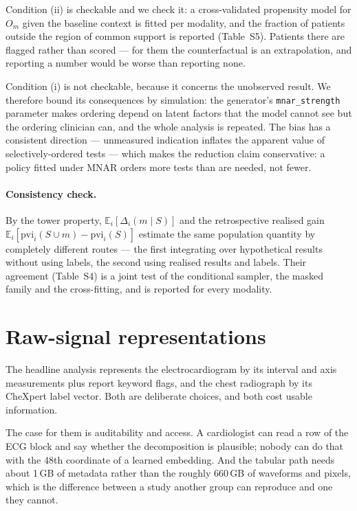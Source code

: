 \documentclass[11pt]{article}
\theoremstyle{definition}
\theoremstyle{remark}
\newcommand{\pvi}{\mathrm{pvi}}
\newcommand{\E}{\mathbb{E}}
\begin{document}
Condition (ii) is checkable and we check it: a cross-validated propensity model
for $O_m$ given the baseline context is fitted per modality, and the fraction of
patients outside the region of common support is reported (Table~S5). Patients
there are flagged rather than scored --- for them the counterfactual is an
extrapolation, and reporting a number would be worse than reporting none.

Condition (i) is not checkable, because it concerns the unobserved result. We
therefore bound its consequences by simulation: the generator's
\texttt{mnar\_strength} parameter makes ordering depend on latent factors that
the model cannot see but the ordering clinician can, and the whole analysis is
repeated. The bias has a consistent direction --- unmeasured indication inflates
the apparent value of selectively-ordered tests --- which makes the reduction
claim conservative: a policy fitted under MNAR orders more tests than are needed,
not fewer.

\paragraph{Consistency check.} By the tower property,
$\E_i[\Delta_i(m\mid S)]$ and the retrospective realised gain
$\E_i[\pvi_i(S\cup m)-\pvi_i(S)]$ estimate the same population quantity by
completely different routes --- the first integrating over hypothetical results
without using labels, the second using realised results and labels. Their
agreement (Table~S4) is a joint test of the conditional sampler, the masked
family and the cross-fitting, and is reported for every modality.


\section{Raw-signal representations}
\label{sec:s-raw}
\label{sec:raw}

The headline analysis represents the electrocardiogram by its interval and axis
measurements plus report keyword flags, and the chest radiograph by its CheXpert
label vector. Both are deliberate choices, and both cost usable information.

The case for them is auditability and access. A cardiologist can read a row of
the ECG block and say whether the decomposition is plausible; nobody can do that
with the 48th coordinate of a learned embedding. And the tabular path needs
about 1\,GB of metadata rather than the roughly 660\,GB of waveforms and pixels,
which is the difference between a study another group can reproduce and one they
cannot.
\end{document}
